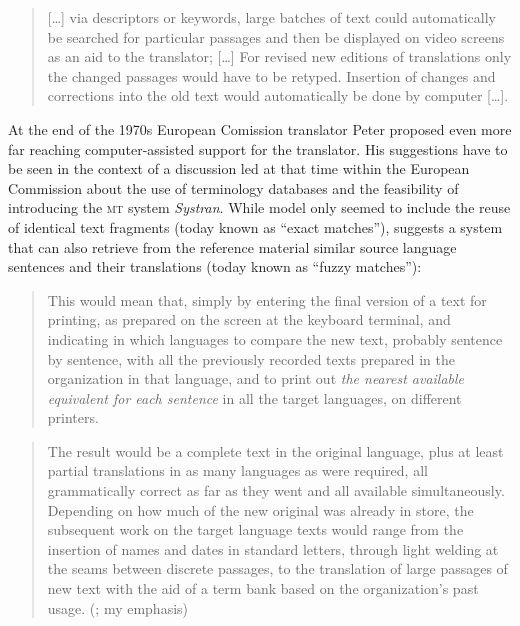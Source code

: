 \documentclass[output=paper]{LSP/langsci}
\begin{document}
\begin{quotation}
[\ldots] via descriptors or keywords, large batches of text could automatically be searched for particular passages and then be displayed on video screens as an aid to the trans\-lator; [\ldots] For revised new editions of translations only the changed passages would have to be retyped. Insertion of changes and corrections into the old text would auto\-matically be done by computer [\ldots]. \citep{Krollmann1971}
\end{quotation}

At the end of the 1970s European Comission translator Peter \citet{Arthern1979} proposed even more far reaching computer-assisted support for the translator. His suggestions have to be seen in the context of a discussion led at that time within the European Commission about the use of terminology databases and the feasibility of introducing the \textsc{mt} system \textit{Systran}. While  model only seemed to include the reuse of identical text fragments (today known as ``exact matches''), \citeauthor{Arthern1979} suggests a system that can also retrieve from the reference material similar source language sentences and their translations (today known as ``fuzzy matches''):

\begin{quotation}
This would mean that, simply by entering the final version of a text for printing, as pre\-pared on the screen at the keyboard terminal, and indicating in which lan\-guages to compare the new text, probably sentence by sentence, with all the pre\-viously recorded texts prepared in the organization in that language, and to print out \textit{the nearest available equivalent for each sentence} in all the target languages, on different printers.
\end{quotation}

\begin{quotation}
The result would be a complete text in the original language, plus at least partial translations in as many languages as were required, all grammatically correct as far as they went and all available simultaneously. Depending on how much of the new original was already in store, the subsequent work on the target language texts would range from the insertion of names and dates in standard letters, through light welding at the seams between discrete passages, to the translation of large passages of new text with the aid of a term bank based on the organization's past usage. (\citealt[94f.]{Arthern1979}; my emphasis)
\end{quotation}
\end{document}
